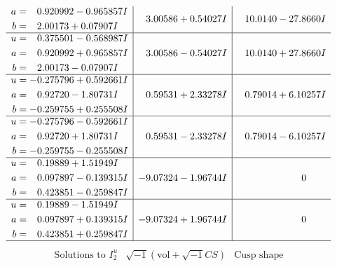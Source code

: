 \documentclass[1p]{elsarticle_modified}
\theoremstyle{definition}
\newcommand{\I}{\sqrt{-1}}
\begin{document}
$$\begin{array}{c|c|c}
\begin{aligned}
a &= \phantom{-}0.920992 - 0.965857 I \\
b &= \phantom{-}2.00173 + 0.07907 I\end{aligned}
 & \phantom{-}3.00586 + 0.54027 I & \phantom{-}10.0140 - 27.8660 I \\ \hline\begin{aligned}
u &= \phantom{-}0.375501 - 0.568987 I \\
a &= \phantom{-}0.920992 + 0.965857 I \\
b &= \phantom{-}2.00173 - 0.07907 I\end{aligned}
 & \phantom{-}3.00586 - 0.54027 I & \phantom{-}10.0140 + 27.8660 I \\ \hline\begin{aligned}
u &= -0.275796 + 0.592661 I \\
a &= \phantom{-}0.92720 - 1.80731 I \\
b &= -0.259755 + 0.255508 I\end{aligned}
 & \phantom{-}0.59531 + 2.33278 I & \phantom{-}0.79014 + 6.10257 I \\ \hline\begin{aligned}
u &= -0.275796 - 0.592661 I \\
a &= \phantom{-}0.92720 + 1.80731 I \\
b &= -0.259755 - 0.255508 I\end{aligned}
 & \phantom{-}0.59531 - 2.33278 I & \phantom{-}0.79014 - 6.10257 I \\ \hline\begin{aligned}
u &= \phantom{-}0.19889 + 1.51949 I \\
a &= \phantom{-}0.097897 - 0.139315 I \\
b &= \phantom{-}0.423851 - 0.259847 I\end{aligned}
 & -9.07324 - 1.96744 I & \phantom{-0.000000 } 0 \\ \hline\begin{aligned}
u &= \phantom{-}0.19889 - 1.51949 I \\
a &= \phantom{-}0.097897 + 0.139315 I \\
b &= \phantom{-}0.423851 + 0.259847 I\end{aligned}
 & -9.07324 + 1.96744 I & \phantom{-0.000000 } 0\\
 \hline 
 \end{array}$$\newpage$$\begin{array}{c|c|c}  
\text{Solutions to }I^u_{2}& \I (\text{vol} + \sqrt{-1}CS) & \text{Cusp shape}\\
 \hline 
\begin{aligned}

\end{aligned}
\end{array}$$
\end{document}
